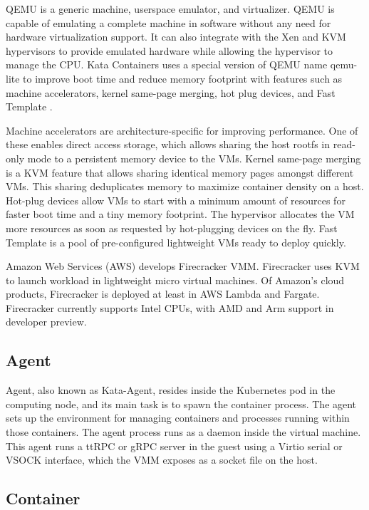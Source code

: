 QEMU is a generic machine, userspace emulator, and virtualizer. QEMU is capable of emulating a complete machine in software without any need for hardware virtualization support. It can also integrate with the Xen and KVM hypervisors to provide emulated hardware while allowing the hypervisor to manage the CPU. Kata Containers uses a special version of QEMU name qemu-lite to improve boot time and reduce memory footprint with features such as machine accelerators, kernel same-page merging, hot plug devices, and Fast Template \cite{Randazzo2019}. \cite{QEMUGithub}\cite{QEMU}

Machine accelerators are architecture-specific for improving performance. One of these enables direct access storage, which allows sharing the host rootfs in read-only mode to a persistent memory device to the VMs. Kernel same-page merging is a KVM feature that allows sharing identical memory pages amongst different VMs. This sharing deduplicates memory to maximize container density on a host. Hot-plug devices allow VMs to start with a minimum amount of resources for faster boot time and a tiny memory footprint. The hypervisor allocates the VM more resources as soon as requested by hot-plugging devices on the fly. Fast Template is a pool of pre-configured lightweight VMs ready to deploy quickly. \cite{Randazzo2019}

 Amazon Web Services (AWS) develops Firecracker VMM. Firecracker uses KVM to launch workload in lightweight micro virtual machines. Of Amazon's cloud products, Firecracker is deployed at least in AWS Lambda and Fargate. Firecracker currently supports Intel CPUs, with AMD and Arm support in developer preview. \cite{AWS}\cite{FirecrackerDesign}\cite{Debab2021}

\subsection{Agent}

Agent, also known as Kata-Agent, resides inside the Kubernetes pod in the computing node, and its main task is to spawn the container process. The agent sets up the environment for managing containers and processes running within those containers. The agent process runs as a daemon inside the virtual machine. This agent runs a ttRPC or gRPC server in the guest using a Virtio serial or VSOCK interface, which the VMM exposes as a socket file on the host. \cite{KataContainersArchitecture}

\subsection{Container}

